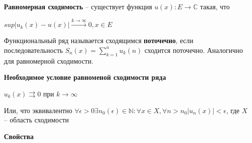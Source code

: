 \documentclass{article}
\begin{document}
	{\bf Равномерная сходимость} -- существует функция $u(x): E \rightarrow \mathbb{C}$ такая, что 
	
	$sup |u_k(x) - u(x)| \xrightarrow {k \rightarrow \infty} 0, x \in E$
	
	Функциональный ряд называется сходящимся {\bf поточечно}, если последовательность $S_n(x) = \sum\limits_{k=1}^{n} u_k(n)$ сходится поточечно. Аналогично для равномерной сходимости.
	
	{\bf Необходимое условие равноменой сходимости ряда}
	
	$u_k(x) \rightrightarrows 0$ при $k \rightarrow \infty$
	
	Или, что эквивалентно $\forall \epsilon > 0 \exists n_0(\epsilon) \in \mathbb{N} : \forall x \in X, \forall n > n_0 |u_n(x)| < \epsilon$, где $X$ -- область сходимости
	
	{\bf Свойства}
	
\end{document}
